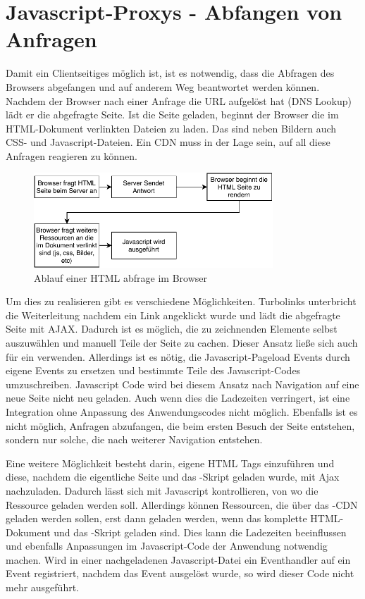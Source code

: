 \section{Javascript-Proxys - Abfangen von Anfragen}\label{k:jsProxies}



Damit ein Clientseitiges \cdn möglich ist, ist es notwendig, dass die Abfragen des Browsers abgefangen und auf anderem Weg beantwortet werden können. Nachdem der Browser nach einer Anfrage die URL aufgelöst hat (DNS Lookup) lädt er die abgefragte Seite. Ist die Seite geladen, beginnt der Browser die im HTML-Dokument verlinkten Dateien zu laden. Das sind neben Bildern auch CSS- und Javascript-Dateien. Ein CDN muss in der Lage sein, auf all diese Anfragen reagieren zu können.

\begin{figure}[!h]
	\centering
	\includegraphics[width=0.8\textwidth]{figures/browser_abfrage}
	\caption[A Figure Short-Title]{Ablauf einer HTML abfrage im Browser}
	\label{fig:browser_abfrage}
\end{figure}


Um dies zu realisieren gibt es verschiedene Möglichkeiten. Turbolinks unterbricht die Weiterleitung nachdem ein Link angeklickt wurde und lädt die abgefragte Seite mit AJAX. Dadurch ist es möglich, die zu zeichnenden Elemente selbst auszuwählen und manuell Teile der Seite zu cachen. Dieser Ansatz ließe sich auch für ein \cdn verwenden. Allerdings ist es nötig, die Javascript-Pageload Events durch eigene Events zu ersetzen und bestimmte Teile des Javascript-Codes umzuschreiben. Javascript Code wird bei diesem Ansatz nach Navigation auf eine neue Seite nicht neu geladen. Auch wenn dies die Ladezeiten verringert, ist eine Integration ohne Anpassung des Anwendungscodes nicht möglich. Ebenfalls ist es nicht möglich, Anfragen abzufangen, die beim ersten Besuch der Seite entstehen, sondern nur solche, die nach weiterer Navigation entstehen.

Eine weitere Möglichkeit besteht darin, eigene HTML Tags einzuführen und diese, nachdem die eigentliche Seite und das \cdn-Skript geladen wurde, mit Ajax nachzuladen. Dadurch lässt sich mit Javascript kontrollieren, von wo die Ressource geladen werden soll. Allerdings können Ressourcen, die über das \pTp-CDN geladen werden sollen, erst dann geladen werden, wenn das komplette HTML-Dokument und das \cdn-Skript geladen sind. Dies kann die Ladezeiten beeinflussen und ebenfalls Anpassungen im Javascript-Code der Anwendung notwendig machen. Wird in einer nachgeladenen Javascript-Datei ein Eventhandler auf ein Event registriert, nachdem das Event ausgelöst wurde, so wird dieser Code nicht mehr ausgeführt.

